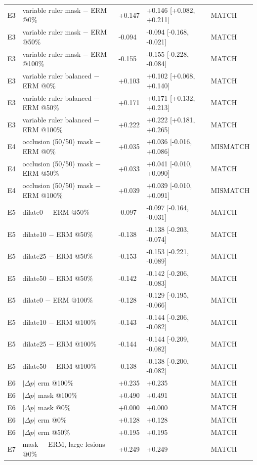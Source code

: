 {\begin{longtable}{llp{1.7cm}p{3.3cm}l}
E3 & variable ruler mask $-$ ERM @0\% & +0.147 & +0.146 [+0.082, +0.211] & MATCH \\
E3 & variable ruler mask $-$ ERM @50\% & -0.094 & -0.094 [-0.168, -0.021] & MATCH \\
E3 & variable ruler mask $-$ ERM @100\% & -0.155 & -0.155 [-0.228, -0.084] & MATCH \\
E3 & variable ruler balanced $-$ ERM @0\% & +0.103 & +0.102 [+0.068, +0.140] & MATCH \\
E3 & variable ruler balanced $-$ ERM @50\% & +0.171 & +0.171 [+0.132, +0.213] & MATCH \\
E3 & variable ruler balanced $-$ ERM @100\% & +0.222 & +0.222 [+0.181, +0.265] & MATCH \\
E4 & occlusion (50/50) mask $-$ ERM @0\% & +0.035 & +0.036 [-0.016, +0.086] & MISMATCH \\
E4 & occlusion (50/50) mask $-$ ERM @50\% & +0.033 & +0.041 [-0.010, +0.090] & MATCH \\
E4 & occlusion (50/50) mask $-$ ERM @100\% & +0.039 & +0.039 [-0.010, +0.091] & MISMATCH \\
E5 & dilate0 $-$ ERM @50\% & -0.097 & -0.097 [-0.164, -0.031] & MATCH \\
E5 & dilate10 $-$ ERM @50\% & -0.138 & -0.138 [-0.203, -0.074] & MATCH \\
E5 & dilate25 $-$ ERM @50\% & -0.153 & -0.153 [-0.221, -0.089] & MATCH \\
E5 & dilate50 $-$ ERM @50\% & -0.142 & -0.142 [-0.206, -0.083] & MATCH \\
E5 & dilate0 $-$ ERM @100\% & -0.128 & -0.129 [-0.195, -0.066] & MATCH \\
E5 & dilate10 $-$ ERM @100\% & -0.143 & -0.144 [-0.206, -0.082] & MATCH \\
E5 & dilate25 $-$ ERM @100\% & -0.144 & -0.144 [-0.209, -0.082] & MATCH \\
E5 & dilate50 $-$ ERM @100\% & -0.138 & -0.138 [-0.200, -0.082] & MATCH \\
E6 & $|\Delta p|$ erm @100\% & +0.235 & +0.235 & MATCH \\
E6 & $|\Delta p|$ mask @100\% & +0.490 & +0.491 & MATCH \\
E6 & $|\Delta p|$ mask @0\% & +0.000 & +0.000 & MATCH \\
E6 & $|\Delta p|$ erm @0\% & +0.128 & +0.128 & MATCH \\
E6 & $|\Delta p|$ erm @50\% & +0.195 & +0.195 & MATCH \\
E7 & mask $-$ ERM, large lesions @0\% & +0.249 & +0.249 & MATCH \\

\end{longtable}}
